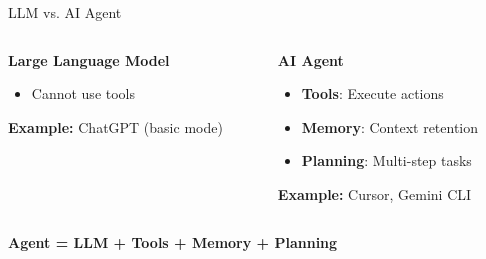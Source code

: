 \documentclass[aspectratio=169]{beamer}
\begin{document}
\begin{frame}{LLM vs. AI Agent}
  \begin{columns}[T]
    \begin{column}{0.48\textwidth}
      \centering
      \large\bfseries
      \textcolor{conesaOrange}{Large Language Model}

      \vspace{0.5cm}
      \normalsize

      \begin{itemize}
        \item Cannot use tools
      \end{itemize}

      \vspace{0.3cm}
      \textbf{Example:} ChatGPT (basic mode)
    \end{column}
    \begin{column}{0.48\textwidth}
      \centering
      \large\bfseries
      \textcolor{conesaTeal}{AI Agent}

      \vspace{0.5cm}
      \normalsize

      \begin{itemize}
        \item \textbf{Tools}: Execute actions
        \item \textbf{Memory}: Context retention
        \item \textbf{Planning}: Multi-step tasks
      \end{itemize}

      \vspace{0.3cm}
      \textbf{Example:} Cursor, Gemini CLI
    \end{column}
  \end{columns}

  \vspace{0.5cm}
  \centering
  \normalsize
  \textbf{Agent = LLM + Tools + Memory + Planning}\supercite{xi2023rise}
\end{frame}
\end{document}
